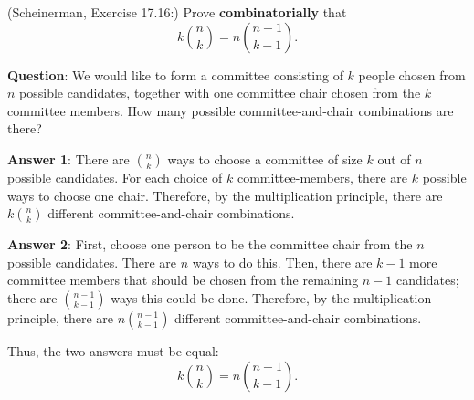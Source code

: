 \documentclass{article}
\theoremstyle{definition}
\begin{document}
\begin{question}
    (Scheinerman, Exercise 17.16:)
    Prove \textbf{combinatorially} that
    \[ k \binom{n}{k}  = n \binom{n-1}{k-1}. \]
\end{question}
\begin{solution}
\textbf{Question}: We would like to form a committee consisting of $k$ people chosen from $n$ possible candidates, together with one committee chair chosen from the $k$ committee members.  How many possible committee-and-chair combinations are there?

\textbf{Answer 1}: There are $\binom{n}{k}$ ways to choose a committee of size $k$ out of $n$ possible candidates.  For each choice of $k$ committee-members, there are $k$ possible ways to choose one chair.  Therefore, by the multiplication principle, there are $k \binom{n}{k}$ different committee-and-chair combinations.

\textbf{Answer 2}: First, choose one person to be the committee chair from the $n$ possible candidates.  There are $n$ ways to do this.  Then, there are $k-1$ more committee members that should be chosen from the remaining $n-1$ candidates; there are $\binom{n-1}{k-1}$ ways this could be done.  Therefore, by the multiplication principle, there are $n \binom{n-1}{k-1}$ different committee-and-chair combinations.

Thus, the two answers must be equal:
\[ k \binom{n}{k} = n \binom{n-1}{k-1}. \]
\end{solution}
\end{document}
